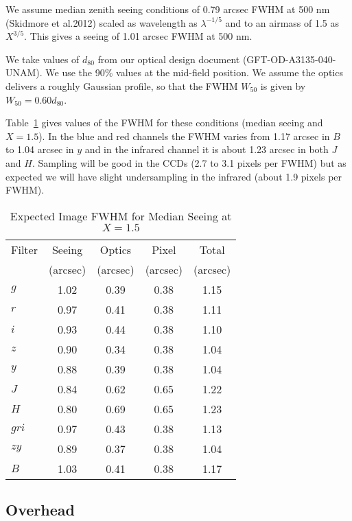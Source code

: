 \documentclass{article}
\begin{document}
We assume median zenith seeing conditions of 0.79 arcsec FWHM at 500 nm (Skidmore et al.\@ 2012) scaled as wavelength as $\lambda^{-1/5}$ and to an airmass of 1.5 as $X^{3/5}$. This gives a seeing of 1.01 arcsec FWHM at 500 nm.

We take values of $d_{80}$ from our optical design document (GFT-OD-A3135-040-UNAM). We use the 90\% values at the mid-field position. We assume the optics delivers a roughly Gaussian profile, so that the FWHM $W_{50}$ is given by $W_{50} = 0.60 d_{80}$.

Table~\ref{table:image-fwhm} gives values of the FWHM for these conditions (median seeing and $X = 1.5$). In the blue and red channels the FWHM varies from 1.17 arcsec in $B$ to 1.04 arcsec in $y$ and in the infrared channel it is about 1.23 arcsec in both $J$ and $H$. Sampling will be good in the CCDs (2.7 to 3.1 pixels per FWHM) but as expected we will have slight undersampling in the infrared (about 1.9 pixels per FWHM).

\begin{table}
\caption{Expected Image FWHM for Median Seeing at $X = 1.5$}
\label{table:image-fwhm}
\medskip
\begin{center}
\begin{tabular}{lcccc}
\hline
\hline
Filter&
Seeing&
Optics&
Pixel&
Total\\
&(arcsec)&(arcsec)&(arcsec)&(arcsec)\\
\hline
$g$  &1.02&0.39&0.38&1.15\\
$r$  &0.97&0.41&0.38&1.11\\
$i$  &0.93&0.44&0.38&1.10\\
$z$  &0.90&0.34&0.38&1.04\\
$y$  &0.88&0.39&0.38&1.04\\
$J$  &0.84&0.62&0.65&1.22\\
$H$  &0.80&0.69&0.65&1.23\\
$gri$&0.97&0.43&0.38&1.13\\
$zy$ &0.89&0.37&0.38&1.04\\
$B$  &1.03&0.41&0.38&1.17\\
\hline
\end{tabular}
\end{center}
\end{table}



\subsection{Overhead}
\end{document}
